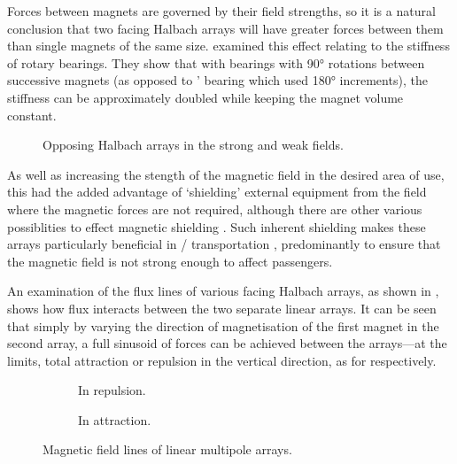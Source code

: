 \documentclass[11pt,a4paper]{memoir}
\begin{document}
Forces between magnets are governed by their field strengths, so
it is a natural conclusion that two facing Halbach arrays will
have greater forces between them than single magnets of the same
size. \textcite{yonnet1991} examined this effect relating to the
stiffness of rotary bearings. They show that with bearings with
\ang{90} rotations between successive magnets (as opposed to
\citeauthor{backers1961}' %
bearing which used \ang{180}
increments), the stiffness can be approximately doubled while
keeping the magnet volume constant.

\begin{figure}[htbp]
   \centering
   \caption{Opposing Halbach arrays in the strong and weak fields.}
\end{figure}

As well as increasing the stength of the magnetic field in the desired area of use, this had the added advantage of `shielding' external equipment from the field where the magnetic forces are not required, although there are other various possiblities to effect magnetic shielding \cite{becherini2009}.
Such inherent shielding makes these arrays particularly beneficial in \maglev/ transportation \cite{hoburg2004}, predominantly to ensure that the magnetic field is not strong enough to affect passengers.


An examination of the flux lines of various facing Halbach arrays, as shown in
, shows how flux interacts between
the two separate linear arrays. It can be seen that simply by varying the
direction of magnetisation of the first magnet in the second array, a full
sinusoid of forces can be achieved between the arrays—at the limits, total
attraction or repulsion in the vertical direction, as for
 respectively.

\begin{figure}
\begin{wide}
  \begin{subfigure}
  \texttt{[image: PhD/Figures/Multipole/2-halb-repl]}
  \caption{In repulsion.}
\end{subfigure}\hfil
\begin{subfigure}
  \texttt{[image: PhD/Figures/Multipole/2-halb-attr]}
  \caption{In attraction.}
\end{subfigure}
\end{wide}
\caption{Magnetic field lines of linear multipole arrays.}
\end{figure}
\end{document}
